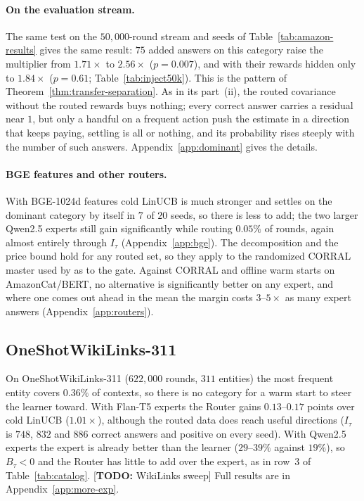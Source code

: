 \documentclass[anon]{alt2027} %
\newcommand{\todo}[1]{\textcolor{red!70!black}{[\textbf{TODO:} #1]}}
\begin{document}
\paragraph{On the evaluation stream.} The same test on the $50{,}000$-round
stream and seeds of Table~\ref{tab:amazon-results} gives the same result:
$75$ added answers on this category raise the multiplier from $1.71\times$ to
$2.56\times$ ($p=0.007$), and with their rewards hidden only to $1.84\times$
($p=0.61$; Table~\ref{tab:inject50k}). This is the pattern of
Theorem~\ref{thm:transfer-separation}. As in its part~(ii), the routed
covariance without the routed rewards buys nothing; every correct answer
carries a residual near $1$, but only a handful on a frequent action push the
estimate in a direction that keeps paying, settling is all or nothing, and
its probability rises steeply with the number of such answers.
Appendix~\ref{app:dominant} gives the details.

\paragraph{BGE features and other routers.}
With BGE-1024d features cold LinUCB is much stronger and settles on the
dominant category by itself in $7$ of $20$ seeds, so there is less to add; the
two larger Qwen2.5 experts still gain significantly while routing $0.05\%$ of
rounds, again almost entirely through $I_\tau$ (Appendix~\ref{app:bge}). The
decomposition and the price bound hold for any routed set, so they apply to
the randomized CORRAL master \citep{agarwal2017corralling} used by
\citet{chen2024llmdecision} as to the gate. Against CORRAL and offline warm
starts on AmazonCat/BERT, no alternative is significantly better on any
expert, and where one comes out ahead in the mean the margin costs $3$--$5\times$
as many expert answers (Appendix~\ref{app:routers}).

\subsection{OneShotWikiLinks-311}
\label{sec:wiki}

On OneShotWikiLinks-311 ($622{,}000$ rounds, $311$ entities) the most
frequent entity covers $0.36\%$ of contexts, so there is no category for a
warm start to steer the learner toward. With Flan-T5 experts the Router
gains $0.13$--$0.17$ points over cold LinUCB ($1.01\times$), although the
routed data does reach useful directions ($I_\tau$ is $748$, $832$ and $886$
correct answers and positive on every seed). With Qwen2.5 experts the expert
is already better than the learner ($29$--$39\%$ against $19\%$), so
$B_\tau<0$ and the Router has little to add over the expert, as in row~3 of
Table~\ref{tab:catalog}.
\todo{WikiLinks sweep} Full results are in Appendix~\ref{app:more-exp}.
\end{document}
